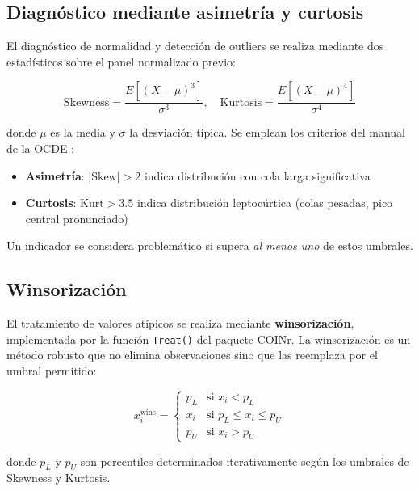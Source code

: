 \subsection{Diagnóstico mediante asimetría y curtosis}

El diagnóstico de normalidad y detección de outliers se realiza mediante dos estadísticos sobre el panel normalizado previo:

\begin{equation}
    \text{Skewness} = \frac{E[(X - \mu)^3]}{\sigma^3}, \quad \text{Kurtosis} = \frac{E[(X - \mu)^4]}{\sigma^4}
\end{equation}

donde $\mu$ es la media y $\sigma$ la desviación típica. Se emplean los criterios del manual de la OCDE \citep{oecd2008handbook}:

\begin{itemize}
    \item \textbf{Asimetría}: $|\text{Skew}| > 2$ indica distribución con cola larga significativa
    \item \textbf{Curtosis}: $\text{Kurt} > 3.5$ indica distribución leptocúrtica (colas pesadas, pico central pronunciado)
\end{itemize}

Un indicador se considera problemático si supera \emph{al menos uno} de estos umbrales.

\subsection{Winsorización}

El tratamiento de valores atípicos se realiza mediante \textbf{winsorización}, implementada por la función \texttt{Treat()} del paquete COINr. La winsorización es un método robusto que no elimina observaciones sino que las reemplaza por el umbral permitido:

\begin{equation}
    x_i^{\text{wins}} = \begin{cases}
        p_L & \text{si } x_i < p_L \\
        x_i & \text{si } p_L \leq x_i \leq p_U \\
        p_U & \text{si } x_i > p_U
    \end{cases}
\end{equation}

donde $p_L$ y $p_U$ son percentiles determinados iterativamente según los umbrales de Skewness y Kurtosis.

